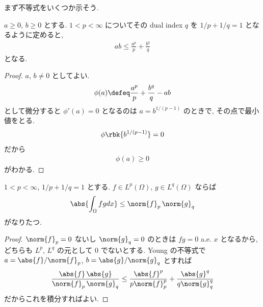 \documentclass[openany, a4paper, oneside]{jsbook}
\begin{document}
まず不等式をいくつか示そう.
\begin{lem}
 $a \ge 0$, $b \ge 0$ とする.
 $1 < p < \infty$ についてその dual index $q$ を $1/p + 1/q = 1$ となるように定めると,
 \begin{align}
  ab
  \le
  \frac{a^p}{p} + \frac{b^q}{q}
 \end{align}
 となる.
\end{lem}
\begin{proof}
$a$, $b \neq 0$ としてよい.
\begin{align}
 \phi(a)
 \defeq
 \frac{a^p}{p} + \frac{b^q}{q} -ab
\end{align}
として微分すると $\phi'(a) = 0$ となるのは $a = b^{1/{(p-1)}}$ のときで, その点で最小値をとる.
\begin{align}
 \phi \rbk{b^{1/{(p-1)}}}
 =
 0
\end{align}
だから
\begin{align}
 \phi(a) \ge 0
\end{align}
がわかる.
\end{proof}

\begin{thm}
 $1 < p < \infty$, $1/p + 1/q = 1$ とする.
 $f \in L^p(\Omega)$, $g \in L^q(\Omega)$
 ならば
 \begin{align}
  \abs{\int_{\Omega} fg dx}
  \leq
  \norm{f}_p \, \norm{g}_q
 \end{align}
 がなりたつ.
\end{thm}
\begin{proof}
$\norm{f}_p = 0$ ないし $\norm{g}_q = 0$ のときは $fg = 0$ a.e. $x$ となるから,
どちらも $L^p$, $L^q$ の元として $0$ でないとする.
Young の不等式で $a = \abs{f} / \norm{f}_p$, $b = \abs{g} / \norm{g}_q$ とすれば
\begin{align}
 \frac{\abs{f} \, \abs{g}}{\norm{f}_p \, \norm{g}_q}
 \le
 \frac{\abs{f}^p}{p \norm{f}_p^p} + \frac{\abs{g}^q}{q \norm{g}_q^q}
\end{align}
だからこれを積分すればよい.
\end{proof}
\end{document}
